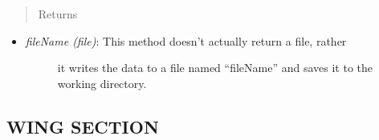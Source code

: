 \documentclass[letterpaper,10pt,english]{sphinxmanual}
\begin{document}
\begin{fulllineitems}
\begin{fulllineitems}
\begin{itemize}
\end{itemize}
\begin{quote}\begin{description}
\item[{Returns}] \leavevmode
\end{description}\end{quote}
\begin{itemize}
\item {} \begin{description}
\item[{\emph{fileName (file)}: This method doesn't actually return a file, rather}] \leavevmode
it writes the data to a file named ``fileName'' and saves it to the
working directory.

\end{description}

\end{itemize}

\end{fulllineitems}


\end{fulllineitems}



\subsection{WING SECTION}
\label{structures:wing-section}
\end{document}
